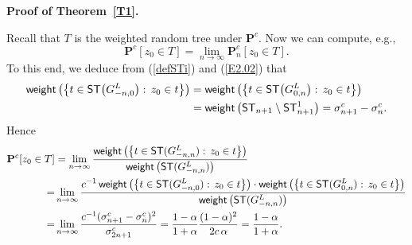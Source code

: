 \documentclass[11pt]{article}
\providecommand{\1}{\mathBB{1}}
\renewcommand{\P}{\mathbf{P}}
\newcommand{\equ}[1]{(\ref{#1})}
\def\SPT{\mathsf{ST}}
\newcommand{\weight}{\mathop{\mbox{\sf weight}}}
\begin{document}
\textbf{Proof of Theorem~\ref{T1}.}\par
Recall that $T$ is the weighted random tree under $\P^c$. Now we can compute, e.g.,
$$\P^c[z_0\in T]=\lim_{n\to\infty}\P^c_n[z_0\in T].$$
To this end, we deduce from \equ{defSTi} and \equ{E2.02} that
$$
\begin{aligned}
\weight\big(\big\{t\in\SPT\big(G^L_{-n,0}\big):\,z_0\in t\big\}\big)
&=\weight\big(\big\{t\in\SPT\big(G^L_{0,n}\big):\,z_0\in t\big\}\big)\\
&=\weight\big(\SPT_{n+1}\setminus\SPT^1_{n+1}\big)=\sigma^c_{n+1}-\sigma^c_{n}.
\end{aligned}$$
Hence
\begin{equation}
\label{E2.08}
\begin{aligned}
\P^c[z_0\in T]
&=\lim_{n\to\infty}\frac{\weight\big(\big\{t\in\SPT(G^{L}_{-n,n}):\,z_0\in t\big\}\big)}{\weight\big(\SPT(G^L_{-n,n})\big)}\\
=&\lim_{n\to\infty}\frac{\displaystyle c^{-1}\weight\big(\big\{t\in\SPT(G^{L}_{-n,0}):\,z_0\in t\big\}\big)\cdot\weight\big(\big\{t\in\SPT(G^{L}_{0,n}):\,z_0\in t\big\}\big)}{\weight\big(\SPT(G^L_{-n,n})\big)}\\
=&\lim_{n\to\infty}\frac{c^{-1}(\sigma^c_{n+1}-\sigma^c_{n})^2}{\sigma^c_{2n+1}}
=\frac{1-\alpha}{1+\alpha}\frac{(1-\alpha)^2}{2c\,\alpha}
=\frac{1-\alpha}{1+\alpha}.
\end{aligned}\end{equation}
\end{document}
